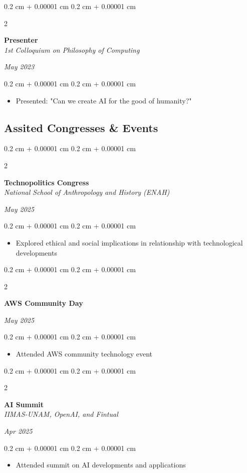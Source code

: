 \documentclass[10pt, letterpaper]{article}
\newenvironment{onecolentry}{
    \begin{adjustwidth}{
        0.2 cm + 0.00001 cm
    }{
        0.2 cm + 0.00001 cm
    }
}{
    \end{adjustwidth}
} %
\newenvironment{twocolentry}[2][]{
    \onecolentry
    \def\secondColumn{#2}
    \setcolumnwidth{\fill, 4.5 cm}
    \begin{paracol}{2}
}{
    \switchcolumn \raggedleft \secondColumn
    \end{paracol}
    \endonecolentry
} %
\begin{document}
    \vspace{0.2 cm}
    \begin{twocolentry}{
    \textit{May 2023}}
        \textbf{Presenter} \\
        \textit{1st Colloquium on Philosophy of Computing}
    \end{twocolentry}
    \begin{onecolentry}
        \begin{itemize}
            \item Presented: "Can we create AI for the good of humanity?"
        \end{itemize}
    \end{onecolentry}
    
    \subsection*{Assited Congresses \& Events}
    
    \begin{twocolentry}{
    \textit{May 2025}}
        \textbf{Technopolitics Congress} \\
        \textit{National School of Anthropology and History (ENAH)}
    \end{twocolentry}
    \begin{onecolentry}
        \begin{itemize}
            \item Explored ethical and social implications in relationship with technological developments
        \end{itemize}
    \end{onecolentry}
    
    \vspace{0.2 cm}
    \begin{twocolentry}{
    \textit{May 2025}}
        \textbf{AWS Community Day}
    \end{twocolentry}
    \begin{onecolentry}
        \begin{itemize}
            \item Attended AWS community technology event
        \end{itemize}
    \end{onecolentry}
    
    \vspace{0.2 cm}
    \begin{twocolentry}{
    \textit{Apr 2025}}
        \textbf{AI Summit} \\
        \textit{IIMAS-UNAM, OpenAI, and Fintual}
    \end{twocolentry}
    \begin{onecolentry}
        \begin{itemize}
            \item Attended summit on AI developments and applications
        \end{itemize}
    \end{onecolentry}
    
\end{document}
